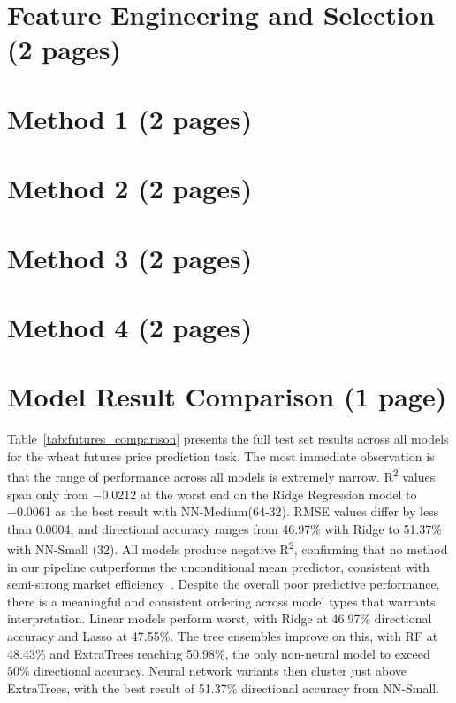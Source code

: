 \documentclass[pdflatex,sn-mathphys-num, oneside]{sn-jnl}%
\theoremstyle{thmstyleone}%
\theoremstyle{thmstyletwo}%
\theoremstyle{thmstylethree}%
\begin{document}
\clearpage

\section{Feature Engineering and Selection (2 pages)}\label{sec3}

\clearpage

\section{Method 1 (2 pages)}\label{sec3}

\clearpage

\section{Method 2 (2 pages)}\label{sec3}

\clearpage

\section{Method 3 (2 pages)}\label{sec3}

\clearpage

\section{Method 4 (2 pages)}\label{sec3}

\clearpage

\section{Model Result Comparison (1 page)}\label{sec3}
Table~\ref{tab:futures_comparison} presents the full test set results across all models for the wheat futures price prediction task. The most immediate observation is that the range of performance across all models is extremely narrow. R\textsuperscript{2} values span only from −0.0212 at the worst end on the Ridge Regression model to −0.0061 as the best result with NN-Medium(64-32). RMSE values differ by less than 0.0004, and directional accuracy ranges from 46.97\% with Ridge to 51.37\% with NN-Small (32). All models produce negative R\textsuperscript{2}, confirming that no method in our pipeline outperforms the unconditional mean predictor, consistent with semi-strong market efficiency~\cite{bib30}. Despite the overall poor predictive performance, there is a meaningful and consistent ordering across model types that warrants interpretation. Linear models perform worst, with Ridge at 46.97\% directional accuracy and Lasso at 47.55\%. The tree ensembles improve on this, with RF at 48.43\% and ExtraTrees reaching 50.98\%, the only non-neural model to exceed 50\% directional accuracy. Neural network variants then cluster just above ExtraTrees, with the best result of 51.37\% directional accuracy from NN-Small.
\end{document}
